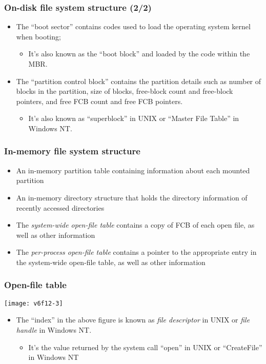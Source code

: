 \documentclass[CJKutf8,dvipsnames,table]{beamer}
\begin{document}
\begin{CJK*}{UTF8}{song}
  \begin{frame}
    \frametitle{On-disk file system structure (2/2)} \pause
    \begin{itemize}\parskip=0pt
    \item The ``boot sector'' contains codes used to load the operating system kernel when booting; \pause
      \begin{itemize}\parskip=0pt
      \item It's also known as the ``boot block'' and loaded by the code within the MBR. \pause
      \end{itemize}
    \item The ``partition control block'' contains the partition details such as number of blocks in the partition, size of blocks, free-block count and free-block pointers, and free FCB count and free FCB pointers. \pause
      \begin{itemize}\parskip=0pt
      \item It's also known as ``superblock'' in UNIX or ``Master File Table'' in Windows NT.
      \end{itemize}
    \end{itemize}
  \end{frame}
  
  \begin{frame}
    \frametitle{In-memory file system structure} \pause
    \begin{itemize}\parskip=0pt
    \item An in-memory partition table containing information about each mounted partition \pause
    \item An in-memory directory structure that holds the directory information of recently accessed directories \pause
    \item The \emph{system-wide open-file table} contains a copy of FCB of each open file, as well as other information \pause
    \item The \emph{per-process open-file table} contains a pointer to the appropriate entry in the system-wide open-file table, as well as other information
    \end{itemize}
  \end{frame}
  
  \begin{frame}
    \frametitle{Open-file table} \pause
    \begin{center}
      \texttt{[image: v6f12-3]} \pause
    \end{center}
    \begin{itemize}\parskip=0pt
    \item The ``index'' in the above figure is known as \emph{file descriptor} in UNIX or \emph{file handle} in Windows NT. \pause
      \begin{itemize}\parskip=0pt
      \item It's the value returned by the system call ``open'' in UNIX or ``CreateFile'' in Windows NT
      \end{itemize}
    \end{itemize}
  \end{frame}
  

\end{CJK*}
\end{document}

